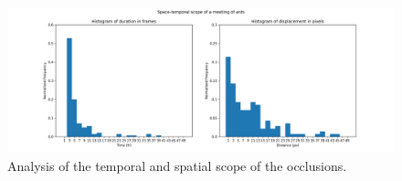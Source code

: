 \begin{figure}[!hp]
    \centering
    \includegraphics[width=\textwidth]{figures/06_results/atr/04_split_scope_hist.png}
    \caption[Analysis of the occlusions]{\footnotesize{Analysis of the temporal and spatial scope of the occlusions.}}
    \label{fig:occlusion_scope}
\end{figure}

